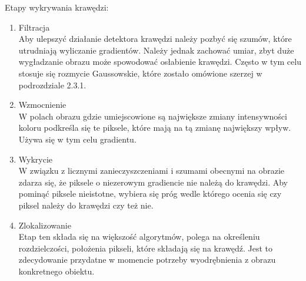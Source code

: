 \documentclass[eng,oneside]{mgr}
\begin{document}
Etapy wykrywania krawędzi:
\begin{enumerate}
\item Filtracja\\
Aby ulepszyć działanie detektora krawędzi należy pozbyć się szumów, które utrudniają wyliczanie gradientów. Należy jednak zachować umiar, zbyt duże wygładzanie obrazu może spowodować osłabienie krawędzi. Często w tym celu stosuje się rozmycie Gaussowskie, które zostało omówione szerzej w podrozdziale 2.3.1.
\item Wzmocnienie \\
W polach obrazu gdzie umiejscowione są największe zmiany intensywności koloru podkreśla się te piksele, które mają na tą zmianę największy wpływ. Używa się w tym celu gradientu.
\item Wykrycie\\
W związku z licznymi zanieczyszczeniami i szumami obecnymi na obrazie zdarza się, że piksele o niezerowym gradiencie nie należą do krawędzi. Aby pominąć piksele nieistotne, wybiera się próg wedle którego ocenia się czy piksel należy do krawędzi czy też nie.
\item Zlokalizowanie\\
Etap ten składa się na większość algorytmów, polega na określeniu rozdzielczości, położenia pikseli, które składają się na krawędź. Jest to zdecydowanie przydatne w momencie potrzeby wyodrębnienia z obrazu konkretnego obiektu\cite{etapy}.

\end{enumerate}
\end{document}
